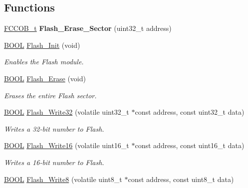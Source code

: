 \subsection*{Functions}
\begin{DoxyCompactItemize}
\item 
\hypertarget{group___flash__module_ga5951819bf5f7375fd9ed9a5f416e86b9}{}\hyperlink{struct_f_c_c_o_b__t}{F\+C\+C\+O\+B\+\_\+t} {\bfseries Flash\+\_\+\+Erase\+\_\+\+Sector} (uint32\+\_\+t address)\label{group___flash__module_ga5951819bf5f7375fd9ed9a5f416e86b9}

\item 
\hyperlink{types_8h_a3e5b8192e7d9ffaf3542f1210aec18dd}{B\+O\+O\+L} \hyperlink{group___flash__module_gae6f8902953e089e0d8a6a1593e465910}{Flash\+\_\+\+Init} (void)
\begin{DoxyCompactList}\small\item\em Enables the Flash module. \end{DoxyCompactList}\item 
\hyperlink{types_8h_a3e5b8192e7d9ffaf3542f1210aec18dd}{B\+O\+O\+L} \hyperlink{group___flash__module_ga6e818ce3e68dff71d2975bb887c5b7bc}{Flash\+\_\+\+Erase} (void)
\begin{DoxyCompactList}\small\item\em Erases the entire Flash sector. \end{DoxyCompactList}\item 
\hyperlink{types_8h_a3e5b8192e7d9ffaf3542f1210aec18dd}{B\+O\+O\+L} \hyperlink{group___flash__module_ga76c844dad8546bce7ceb837b0ebe692a}{Flash\+\_\+\+Write32} (volatile uint32\+\_\+t $\ast$const address, const uint32\+\_\+t data)
\begin{DoxyCompactList}\small\item\em Writes a 32-\/bit number to Flash. \end{DoxyCompactList}\item 
\hyperlink{types_8h_a3e5b8192e7d9ffaf3542f1210aec18dd}{B\+O\+O\+L} \hyperlink{group___flash__module_ga3b1945cab517f6d476c9e365dcba02c7}{Flash\+\_\+\+Write16} (volatile uint16\+\_\+t $\ast$const address, const uint16\+\_\+t data)
\begin{DoxyCompactList}\small\item\em Writes a 16-\/bit number to Flash. \end{DoxyCompactList}\item 
\hyperlink{types_8h_a3e5b8192e7d9ffaf3542f1210aec18dd}{B\+O\+O\+L} \hyperlink{group___flash__module_ga5591ecf92f70de6e9d04c79c793495d3}{Flash\+\_\+\+Write8} (volatile uint8\+\_\+t $\ast$const address, const uint8\+\_\+t data)

\end{DoxyCompactItemize}
